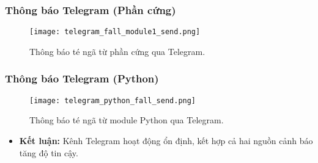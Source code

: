 \begin{frame}[fragile]
\frametitle{Thông báo Telegram (Phần cứng)}
\begin{figure}[H]
    \centering
    \texttt{[image: telegram\_fall\_module1\_send.png]}
    \caption{Thông báo té ngã từ phần cứng qua Telegram.}
\end{figure}
\end{frame}

\begin{frame}[fragile]
\frametitle{Thông báo Telegram (Python)}
\begin{figure}[H]
    \centering
    \texttt{[image: telegram\_python\_fall\_send.png]}
    \caption{Thông báo té ngã từ module Python qua Telegram.}
\end{figure}
\begin{itemize}
    \item \textbf{Kết luận:} Kênh Telegram hoạt động ổn định, kết hợp cả hai nguồn cảnh báo tăng độ tin cậy.
\end{itemize}
\end{frame}

